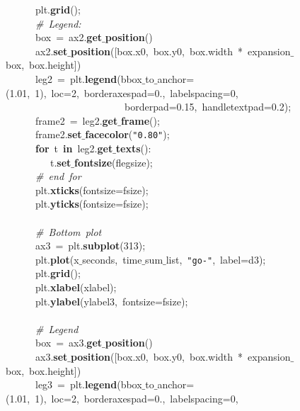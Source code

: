 \mbox{}\ \ \ \ \ \ plt.\textbf{grid}(); \\
\mbox{}\ \ \ \ \ \ \textit{\#\ Legend:} \\
\mbox{}\ \ \ \ \ \ box\ =\ ax2.\textbf{get$\_$position}() \\
\mbox{}\ \ \ \ \ \ ax2.\textbf{set$\_$position}([box.x0,\ box.y0,\ box.width\ *\ expansion$\_$box,\ box.height]) \\
\mbox{}\ \ \ \ \ \ leg2\ =\ plt.\textbf{legend}(bbox$\_$to$\_$anchor=(1.01,\ 1),\ loc=2,\ borderaxespad=0.,\ labelspacing=0,\  \\
\mbox{}\ \ \ \ \ \ \ \ \ \ \ \ \ \ \ \ \ \ \ \ \ \ \ \ borderpad=0.15,\ handletextpad=0.2); \\
\mbox{}\ \ \ \ \ \ frame2\ =\ leg2.\textbf{get$\_$frame}(); \\
\mbox{}\ \ \ \ \ \ frame2.\textbf{set$\_$facecolor}(\texttt{"{}0.80"{}}); \\
\mbox{}\ \ \ \ \ \ \textbf{for}\ t\ \textbf{in}\ leg2.\textbf{get$\_$texts}(): \\
\mbox{}\ \ \ \ \ \ \ \ \ t.\textbf{set$\_$fontsize}(flegsize); \\
\mbox{}\ \ \ \ \ \ \textit{\#\ end\ for} \\
\mbox{}\ \ \ \ \ \ plt.\textbf{xticks}(fontsize=fsize); \\
\mbox{}\ \ \ \ \ \ plt.\textbf{yticks}(fontsize=fsize); \\
\mbox{}\ \ \ \ \ \  \\
\mbox{}\ \ \ \ \ \ \textit{\#\ Bottom\ plot} \\
\mbox{}\ \ \ \ \ \ ax3\ =\ plt.\textbf{subplot}(313); \\
\mbox{}\ \ \ \ \ \ plt.\textbf{plot}(x$\_$seconds,\ time$\_$sum$\_$list,\ \texttt{"{}go-"{}},\ label=d3); \\
\mbox{}\ \ \ \ \ \ plt.\textbf{grid}(); \\
\mbox{}\ \ \ \ \ \ plt.\textbf{xlabel}(xlabel); \\
\mbox{}\ \ \ \ \ \ plt.\textbf{ylabel}(ylabel3,\ fontsize=fsize); \\
\mbox{}\ \ \ \ \ \  \\
\mbox{}\ \ \ \ \ \ \textit{\#\ Legend} \\
\mbox{}\ \ \ \ \ \ box\ =\ ax3.\textbf{get$\_$position}() \\
\mbox{}\ \ \ \ \ \ ax3.\textbf{set$\_$position}([box.x0,\ box.y0,\ box.width\ *\ expansion$\_$box,\ box.height]) \\
\mbox{}\ \ \ \ \ \ leg3\ =\ plt.\textbf{legend}(bbox$\_$to$\_$anchor=(1.01,\ 1),\ loc=2,\ borderaxespad=0.,\ labelspacing=0,\  \\

